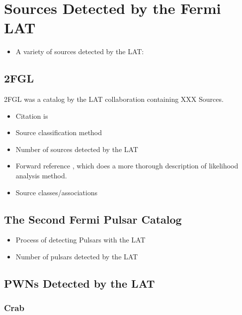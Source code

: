
\section{Sources Detected by the Fermi \acs{LAT}}

\begin{itemize}
  \item A variety of sources detected by the \acs{LAT}:
\end{itemize}

\subsection{\acf{2FGL}}

\ac{2FGL} was a catalog by the LAT collaboration containing XXX Sources.

\begin{itemize}
  \item Citation is \cite{nolan_2012_fermi-large}
  \item Source classification method
  \item Number of sources detected by the \ac{LAT}
  \item Forward reference ,
    which does a more thorough description of likelihood analysis method.
  \item Source classes/associations
\end{itemize}

\subsection{The Second Fermi Pulsar Catalog}

\begin{itemize}
  \item Process of detecting Pulsars with the \ac{LAT}
  \item Number of pulsars detected by the \ac{LAT}
\end{itemize}

\subsection{\acsp{PWN} Detected by the \ac{LAT}}

\subsubsection{Crab}

